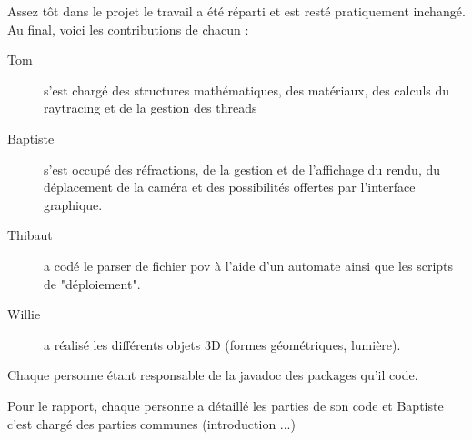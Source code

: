 Assez tôt dans le projet le travail a été réparti et est resté pratiquement inchangé. Au final, voici les contributions de chacun :
\begin{description}
    \item [Tom] s'est chargé des structures mathématiques, des matériaux, des calculs du raytracing et de la gestion des threads
    \item [Baptiste] s'est occupé des réfractions, de la gestion et de l'affichage du rendu, du déplacement de la caméra et des possibilités offertes par l'interface graphique.
    \item [Thibaut] a codé le parser de fichier pov à l'aide d'un automate ainsi que les scripts de "déploiement".
    \item [Willie] a réalisé les différents objets 3D (formes géométriques, lumière).
\end{description}

Chaque personne étant responsable de la javadoc des packages qu'il code.

Pour le rapport, chaque personne a détaillé les parties de son code et Baptiste c'est chargé des parties communes (introduction ...)
